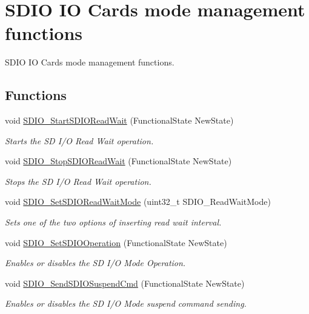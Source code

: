 \hypertarget{group___s_d_i_o___group4}{\section{S\-D\-I\-O I\-O Cards mode management functions}
\label{group___s_d_i_o___group4}
}


S\-D\-I\-O I\-O Cards mode management functions.  


\subsection*{Functions}
\begin{DoxyCompactItemize}
\item 
void \hyperlink{group___s_d_i_o___group4_gac88f914d9a68a83abc2265ec8a7b79fc}{S\-D\-I\-O\-\_\-\-Start\-S\-D\-I\-O\-Read\-Wait} (Functional\-State New\-State)
\begin{DoxyCompactList}\small\item\em Starts the S\-D I/\-O Read Wait operation. \end{DoxyCompactList}\item 
void \hyperlink{group___s_d_i_o___group4_gaca6b25eb2debb73ac827c66f0ebcf837}{S\-D\-I\-O\-\_\-\-Stop\-S\-D\-I\-O\-Read\-Wait} (Functional\-State New\-State)
\begin{DoxyCompactList}\small\item\em Stops the S\-D I/\-O Read Wait operation. \end{DoxyCompactList}\item 
void \hyperlink{group___s_d_i_o___group4_ga2baac4ea1bb6c2d94345d2712604338a}{S\-D\-I\-O\-\_\-\-Set\-S\-D\-I\-O\-Read\-Wait\-Mode} (uint32\-\_\-t S\-D\-I\-O\-\_\-\-Read\-Wait\-Mode)
\begin{DoxyCompactList}\small\item\em Sets one of the two options of inserting read wait interval. \end{DoxyCompactList}\item 
void \hyperlink{group___s_d_i_o___group4_ga24e210c185d5a7855cbaff4472a8f8d1}{S\-D\-I\-O\-\_\-\-Set\-S\-D\-I\-O\-Operation} (Functional\-State New\-State)
\begin{DoxyCompactList}\small\item\em Enables or disables the S\-D I/\-O Mode Operation. \end{DoxyCompactList}\item 
void \hyperlink{group___s_d_i_o___group4_ga9264137a01a1ab81d03bc80a3b3120fc}{S\-D\-I\-O\-\_\-\-Send\-S\-D\-I\-O\-Suspend\-Cmd} (Functional\-State New\-State)
\begin{DoxyCompactList}\small\item\em Enables or disables the S\-D I/\-O Mode suspend command sending. \end{DoxyCompactList}\end{DoxyCompactItemize}


